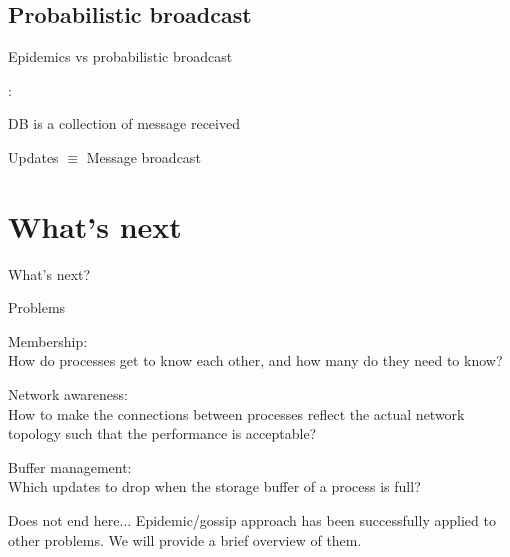 \subsection{Probabilistic broadcast}

\begin{frame}{Epidemics vs probabilistic broadcast}
	
:

DB is a collection of message received

\bigskip
{}

Updates $\equiv$ Message broadcast

\end{frame}


\section{What's next}

\begin{frame}{What's next?}

\begin{block}{Problems}
\BI
\item \alert{Membership}:\\How do processes get to know each other, and how many do 
they need to know?
\item \alert{Network awareness}:\\ How to make the connections between processes reflect the actual 
network topology such that the performance is acceptable? 
\item \alert{Buffer management}:\\
Which updates to drop when the storage buffer of a process is full? 
\EI
\end{block}


\begin{block}{Does not end here...}
Epidemic/gossip approach has been successfully applied to other problems. 
We will provide a brief overview of them.
\end{block}

\end{frame}

\begin{RMFrame}

\BI
\item {}
\item {}
\EI

\end{RMFrame}


